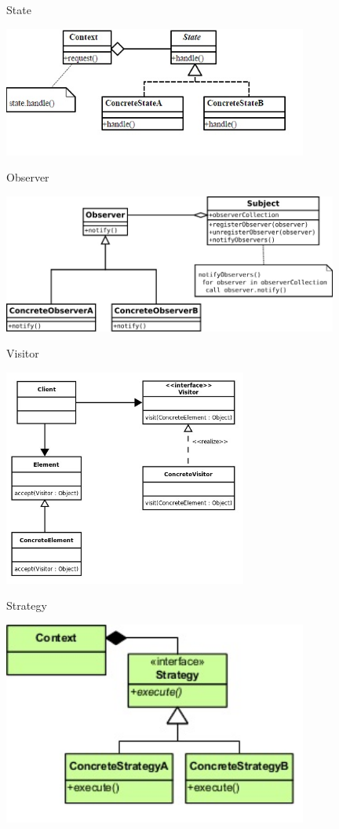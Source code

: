 \begin{frame}{State}
	\begin{center}
		\includegraphics[width=10cm]{pattern_state.jpg}
	\end{center}
\end{frame}

\begin{frame}{Observer}
	\begin{center}
		\includegraphics[width=11cm]{pattern_observer.jpg}
	\end{center}
\end{frame}

\begin{frame}{Visitor}
	\begin{center}
		\includegraphics[width=8cm]{pattern_visitor.jpg}
	\end{center}
\end{frame}

\begin{frame}{Strategy}
	\begin{center}
		\includegraphics[width=10cm]{pattern_strategy.jpg}
	\end{center}
\end{frame}